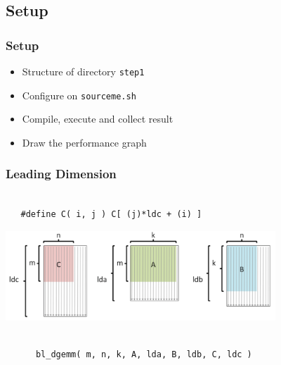 \documentclass[xcolor=pdflatex,dvipsnames,table]{beamer}
\begin{document}
\subsection{Setup}

\begin{frame}[fragile]
\frametitle{Setup}
\begin{itemize}
\item Structure of directory {\tt step1}
\item Configure on {\tt sourceme.sh}
\item Compile, execute and collect result
\item Draw the performance graph
\end{itemize}
\end{frame}

\begin{frame}[fragile]
\frametitle{Leading Dimension}

\begin{verbatim}

   #define C( i, j ) C[ (j)*ldc + (i) ]

\end{verbatim}

\begin{center}
	\includegraphics[width=4in]{figures/LeadingDims.pdf}
\end{center}


\begin{verbatim}

      bl_dgemm( m, n, k, A, lda, B, ldb, C, ldc )

\end{verbatim}

\end{frame}
\end{document}
